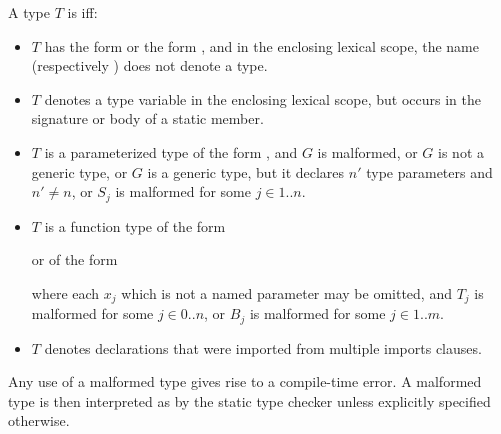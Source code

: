 \documentclass[makeidx]{article}
\begin{document}
{

\LMHash{}%
A type $T$ is  if{}f:
\begin{itemize}
\item
  $T$ has the form \id{} or the form ,
  and in the enclosing lexical scope,
  the name \id{} (respectively ) does not denote a type.

\item
  $T$ denotes a type variable in the enclosing lexical scope,
  but occurs in the signature or body of a static member.

\item $T$ is a parameterized type of the form ,
  and $G$ is malformed,
  or $G$ is not a generic type,
  or $G$ is a generic type, but it declares $n'$ type parameters and $n' \not= n$,
  or $S_j$ is malformed for some $j \in 1 .. n$.

\item $T$ is a function type of the form



  \noindent
  or of the form



  \noindent
  where each $x_j$ which is not a named parameter may be omitted,
  and $T_j$ is malformed for some $j \in 0 .. n$,
  or $B_j$ is malformed for some $j \in 1 .. m$.

\item
  $T$ denotes declarations that were imported from multiple imports clauses.
\end{itemize}

\LMHash{}%
Any use of a malformed type gives rise to a compile-time error.
A malformed type is then interpreted as \DYNAMIC{} by the static type checker unless explicitly specified otherwise.

}
\end{document}
